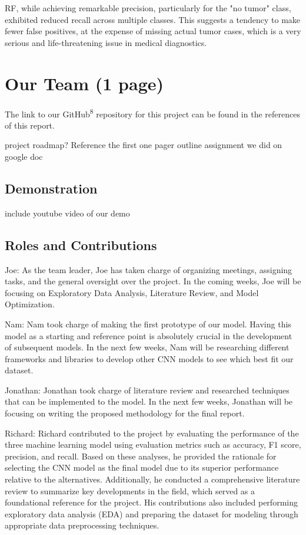 \documentclass[conference]{IEEEtran}
\begin{document}
RF, while achieving remarkable precision, particularly for the "no tumor" class, exhibited reduced recall across multiple classes. This suggests a tendency to make fewer false positives, at the expense of missing actual tumor cases, which is a very serious and life-threatening issue in medical diagnostics.

\section{\large Our Team (1 page)}
The link to our GitHub\textsuperscript{8} repository for this project can be found in the references of this report.

project roadmap? Reference the first one pager outline assignment we did on google doc
\subsection{\large Demonstration}
include youtube video of our demo

\subsection{\large Roles and Contributions}

Joe: As the team leader, Joe has taken charge of organizing meetings, assigning tasks, and the general oversight over the project. In the coming weeks, Joe will be focusing on Exploratory Data Analysis, Literature Review, and Model Optimization. 

Nam: Nam took charge of making the first prototype of our model. Having this model as a starting and reference point is absolutely crucial in the development of subsequent models. In the next few weeks, Nam will be researching different frameworks and libraries to develop other CNN models to see which best fit our dataset.

Jonathan: Jonathan took charge of literature review and researched techniques that can be implemented to the model. In the next few weeks, Jonathan will be focusing on writing the proposed methodology for the final report.

Richard: Richard contributed to the project by evaluating the performance of the three machine learning model using evaluation metrics such as accuracy, F1 score, precision, and recall. Based on these analyses, he provided the rationale for selecting the CNN model as the final model due to its superior performance relative to the alternatives. Additionally, he conducted a comprehensive literature review to summarize key developments in the field, which served as a foundational reference for the project. His contributions also included performing exploratory data analysis (EDA) and preparing the dataset for modeling through appropriate data preprocessing techniques.
\end{document}
